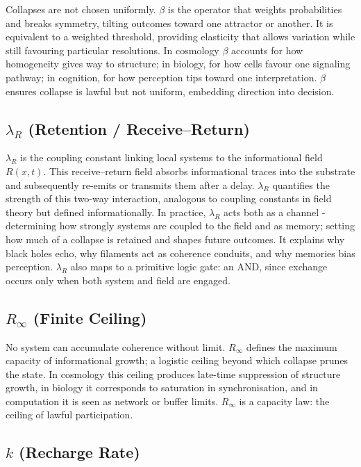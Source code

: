 Collapses are not chosen uniformly. $\beta$ is the operator that weights probabilities and breaks symmetry, tilting outcomes toward one attractor or another. It is equivalent to a weighted threshold, providing elasticity that allows variation while still favouring particular resolutions. In cosmology $\beta$ accounts for how homogeneity gives way to structure; in
biology, for how cells favour one signaling pathway; in cognition, for how perception tips
toward one interpretation. $\beta$ ensures collapse is lawful but not uniform, embedding
direction into decision.

\subsection{$\lambda_R$ (Retention / Receive--Return)}

$\lambda_R$ is the coupling constant linking local systems to the informational field $R(x,t)$. This receive--return field absorbs informational traces into the substrate and subsequently re-emits or transmits them after a delay. $\lambda_R$ quantifies the strength of this two-way interaction, analogous to coupling constants in field theory but defined informationally. In practice, $\lambda_R$ acts both as a channel - determining how strongly systems are coupled to the field and as memory; setting how much of a collapse is retained and shapes future outcomes. It explains why black holes echo, why filaments act as coherence conduits, and why memories bias
perception.  $\lambda_R$ also maps to a primitive logic gate: an AND, since exchange occurs only when both system and field are engaged.

\subsection{$R_\infty$ (Finite Ceiling)}

No system can accumulate coherence without limit. $R_\infty$ defines the maximum capacity of informational growth; a logistic ceiling beyond which collapse prunes the state. In
cosmology this ceiling produces late-time suppression of structure growth, in biology it
corresponds to saturation in synchronisation, and in computation it is seen as network or buffer
limits. $R_\infty$ is a capacity law: the ceiling of lawful participation.

\subsection{$k$ (Recharge Rate)}

